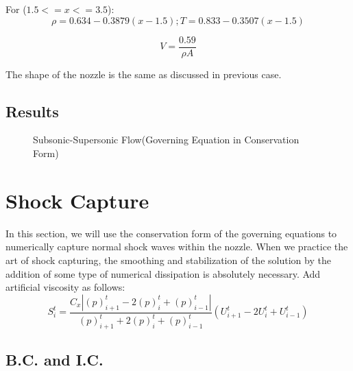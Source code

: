 For ($1.5<=x<=3.5$):
\begin{equation}
\rho = 0.634-0.3879(x-1.5); T =0.833-0.3507(x-1.5)
\end{equation}

\begin{equation}
V = \frac{0.59}{\rho A}
\end{equation}

The shape of the nozzle is the same as discussed in previous case.

\subsection{Results}
\begin{figure}[htbp]
\centering
{}%
\centering
{}%
\caption{Subsonic-Supersonic Flow(Governing Equation in Conservation Form)}
\end{figure}

\section{Shock Capture}
In this section, we will use the conservation form of the governing equations to numerically capture normal shock waves within the nozzle. When we practice the art of shock capturing, the smoothing and stabilization of the solution by the addition of some type of numerical dissipation is absolutely necessary. Add artificial viscosity as follows:
\begin{equation}
S^t_i = \frac{C_x|(p)^t_{i+1}-2(p)^t_i+(p)^t_{i-1}|}{(p)^t_{i+1}+2(p)^t_i+(p)^t_{i-1}}(U^t_{i+1}-2U^t_i+U^t_{i-1})
\end{equation}

\subsection{B.C. and I.C.}

